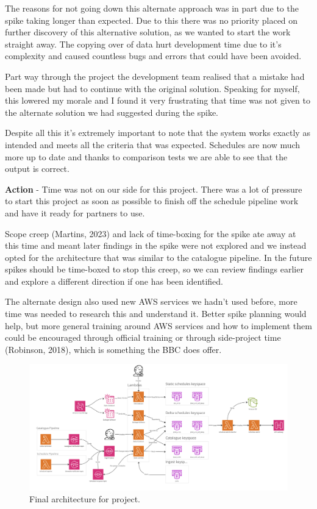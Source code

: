   The reasons for not going down this alternate approach was in part due to the spike taking longer than expected. Due to this there was no priority placed 
  on further discovery of this alternative solution, as we wanted to start the work straight away. The copying over of data hurt development time due to 
  it's complexity and caused countless bugs and errors that could have been avoided. 
  
  Part way through the project the development team realised that a mistake had been made but had to continue with the original solution. 
  Speaking for myself, this lowered my morale and I found it very frustrating that time was not given to the alternate solution we had suggested during 
  the spike.

  Despite all this it's extremely important to note that the system works exactly as intended and meets all the criteria that was expected. Schedules are 
  now much more up to date and thanks to comparison tests we are able to see that the output is correct.

  \vspace{0.2cm}
  \textbf{Action} - Time was not on our side for this project. There was a lot of pressure to start this project as soon as possible to finish off the 
  schedule pipeline work and have it ready for partners to use.

  Scope creep (Martins, 2023) and lack of time-boxing for the spike ate away at this time and meant later findings in the spike were not explored and we 
  instead opted for the architecture that was similar to the catalogue pipeline. In the future spikes should be time-boxed to stop this creep, 
  so we can review findings earlier and explore a different direction if one has been identified.

  The alternate design also used new AWS services we hadn't used before, more time was needed to research this and understand it. Better spike planning 
  would help, but more general training around AWS services and how to implement them could be encouraged through official training or through side-project
  time (Robinson, 2018), which is something the BBC does offer.

  \begin{landscape}
    \begin{figure}[H]
      \centering
      \includegraphics[width=20cm]{assets/outputs/finalArchitecture.png}
      \caption{Final architecture for project.}
      \label{fig:finalArchitecture}
    \end{figure}
  \end{landscape}

